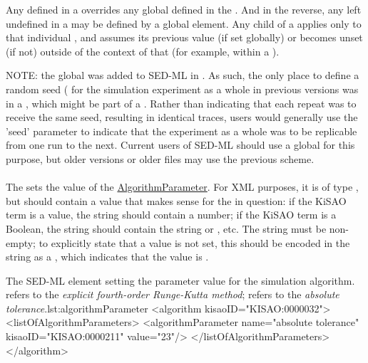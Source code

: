Any \AlgorithmParameter defined in a \Simulation overrides any global \AlgorithmParameter defined in the \SedDocument.  And in the reverse, any \AlgorithmParameter left undefined in a \Simulation may be defined by a global \AlgorithmParameter element.  Any \AlgorithmParameter child of a \Simulation applies only to that individual \Simulation, and assumes its previous value (if set globally) or becomes unset (if not) outside of the context of that \Simulation (for example, within a \RepeatedTask).

NOTE:  the global \ListOfAlgorithmParameters was added to SED-ML in \currentLV.  As such, the only place to define a random seed ( for the simulation experiment as a whole in previous versions was in a \Simulation, which might be part of a \RepeatedTask.  Rather than indicating that each repeat was to receive the same seed, resulting in identical traces, users would generally use the 'seed' parameter to indicate that the experiment as a whole was to be replicable from one run to the next.  Current users of SED-ML should use a global \AlgorithmParameter for this purpose, but older versions or older files may use the previous scheme.

\paragraph*{}
\label{sec:algorithmParameterValue}
The  sets the value of the \hyperref[class:algorithmParameter]{AlgorithmParameter}.  For XML purposes, it is of type , but should contain a value that makes sense for the  in question:  if the KiSAO term is a value, the string should contain a number; if the KiSAO term is a Boolean, the string should contain the string  or , etc.  The string must be non-empty; to explicitly state that a value is not set, this should be encoded in the string as a , which indicates that the value is .

\begin{myXmlLst}{The SED-ML  element setting the parameter value for the simulation algorithm.  refers to the \emph{explicit fourth-order Runge-Kutta method};  refers to the \emph{absolute tolerance}.}{lst:algorithmParameter}
<algorithm kisaoID="KISAO:0000032"> 
	<listOfAlgorithmParameters> 
		<algorithmParameter name="absolute tolerance" kisaoID="KISAO:0000211" value="23"/> 
	</listOfAlgorithmParameters>
</algorithm>
\end{myXmlLst}

